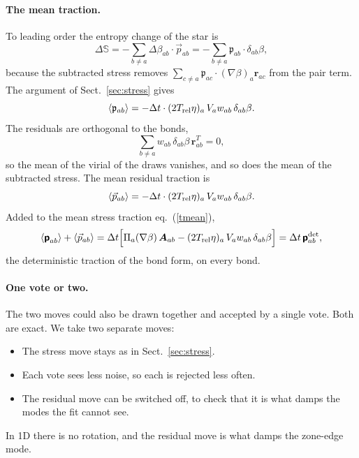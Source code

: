 \documentclass[11pt,aps,preprint,nofootinbib,superscriptaddress,tightenlines]{revtex4-2}
\def\st{\begin{equation}}
\def\stp{\end{equation}}
\def\Eq#1{eq.~(\ref{#1})}
\def\Sect#1{Sect.~\ref{#1}}
\newcommand{\pf}{\bm{\mathsf p}}
\newcommand{\avg}[1]{\langle #1\rangle}
\let\oldparagraph\paragraph
\renewcommand{\paragraph}{\par\bigskip\oldparagraph}
\begin{document}
\paragraph{The mean traction.}  To leading order the entropy change of the
star is
\st
\Delta\mathbb S=-\sum_{b\neq a}\Delta\beta_{ab}\cdot\vec p_{ab}
=-\sum_{b\neq a}\mathfrak p_{ab}\cdot\delta_{ab}\beta ,
\stp
because the subtracted stress removes $\sum_{c\neq a}\mathfrak p_{ac}\cdot (\nabla\beta)_a\bm r_{ac}$
from the pair term.  The argument of \Sect{sec:stress} gives
\st
\avg{\mathfrak p_{ab}}=-\Delta t\cdot (2T_{\rm rel}\eta)_a\,V_aw_{ab}\,\delta_{ab}\beta .
\stp
The residuals are orthogonal to the bonds,
\st
\sum_{b\neq a}w_{ab}\,\delta_{ab}\beta\,\bm r_{ab}^T=0 ,
\stp
so the mean of the virial of the draws vanishes, and so does the mean of the
subtracted stress.
The mean residual traction is
\st
\avg{\vec p_{ab}}=-\Delta t\cdot (2T_{\rm rel}\eta)_a\,V_aw_{ab}\,\delta_{ab}\beta .
\stp
Added to the mean stress traction \Eq{tmean},
\st
\avg{\pf_{ab}}+\avg{\vec p_{ab}}
=\Delta t\Big[\Pi_a(\nabla\beta)\,\bm A_{ab}-(2T_{\rm rel}\eta)_a\,V_aw_{ab}\,\delta_{ab}\beta\Big]
=\Delta t\,\pf^{\rm det}_{ab} ,
\stp
the deterministic traction of the bond form, on every bond.

\paragraph{One vote or two.}  The two moves could also be drawn together and
accepted by a single vote.  Both are exact.  We take two separate moves:
\begin{itemize}
\item The stress move stays as in \Sect{sec:stress}.
\item Each vote sees less noise, so each is rejected less often.
\item The residual move can be switched off, to check that it is what damps the
  modes the fit cannot see.
\end{itemize}
In 1D there is no rotation, and the residual move is what damps the zone-edge
mode.
\end{document}
